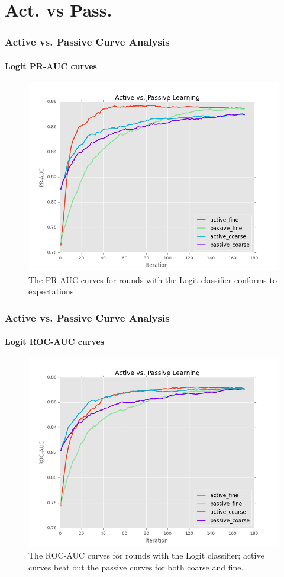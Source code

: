 \documentclass{beamer}
\begin{document}
\section{Act. vs Pass.}
\begin{frame}
    \frametitle{Active vs. Passive Curve Analysis}
    \framesubtitle{Logit PR-AUC curves}
    \begin{figure}[!htb]
        \centering
        \includegraphics[width=0.80\columnwidth]{fig/runActPassLogReg_pr}
        \caption{The PR-AUC curves for rounds with the Logit classifier conforms to expectations}
    \label{fig:runActPassLogReg_pr}
    \end{figure}
\end{frame}
\begin{frame}
    \frametitle{Active vs. Passive Curve Analysis}
    \framesubtitle{Logit ROC-AUC curves}
    \begin{figure}[!htb]
        \centering
        \includegraphics[width=0.80\columnwidth]{fig/runActPassLogReg_roc}
        \caption{The ROC-AUC curves for rounds with the
    Logit classifier; active curves beat out the passive
    curves for both coarse and fine.}
    \label{fig:runActPassLogReg_roc}
    \end{figure}
\end{frame}
\end{document}
